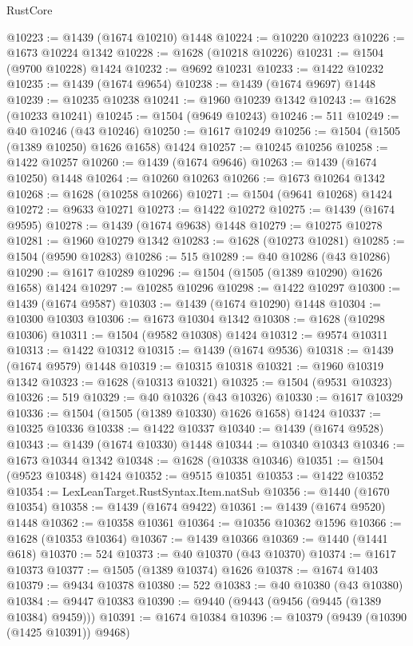 \begin{lexlean}{RustCore}
\begin{coremodule}
@10223 := @1439 (@1674 @10210) @1448
@10224 := @10220 @10223
@10226 := @1673 @10224 @1342
@10228 := @1628 (@10218 @10226)
@10231 := @1504 (@9700 @10228) @1424
@10232 := @9692 @10231
@10233 := @1422 @10232
@10235 := @1439 (@1674 @9654)
@10238 := @1439 (@1674 @9697) @1448
@10239 := @10235 @10238
@10241 := @1960 @10239 @1342
@10243 := @1628 (@10233 @10241)
@10245 := @1504 (@9649 @10243)
@10246 := 511
@10249 := @40 @10246 (@43 @10246)
@10250 := @1617 @10249
@10256 := @1504 (@1505 (@1389 @10250) @1626 @1658) @1424
@10257 := @10245 @10256
@10258 := @1422 @10257
@10260 := @1439 (@1674 @9646)
@10263 := @1439 (@1674 @10250) @1448
@10264 := @10260 @10263
@10266 := @1673 @10264 @1342
@10268 := @1628 (@10258 @10266)
@10271 := @1504 (@9641 @10268) @1424
@10272 := @9633 @10271
@10273 := @1422 @10272
@10275 := @1439 (@1674 @9595)
@10278 := @1439 (@1674 @9638) @1448
@10279 := @10275 @10278
@10281 := @1960 @10279 @1342
@10283 := @1628 (@10273 @10281)
@10285 := @1504 (@9590 @10283)
@10286 := 515
@10289 := @40 @10286 (@43 @10286)
@10290 := @1617 @10289
@10296 := @1504 (@1505 (@1389 @10290) @1626 @1658) @1424
@10297 := @10285 @10296
@10298 := @1422 @10297
@10300 := @1439 (@1674 @9587)
@10303 := @1439 (@1674 @10290) @1448
@10304 := @10300 @10303
@10306 := @1673 @10304 @1342
@10308 := @1628 (@10298 @10306)
@10311 := @1504 (@9582 @10308) @1424
@10312 := @9574 @10311
@10313 := @1422 @10312
@10315 := @1439 (@1674 @9536)
@10318 := @1439 (@1674 @9579) @1448
@10319 := @10315 @10318
@10321 := @1960 @10319 @1342
@10323 := @1628 (@10313 @10321)
@10325 := @1504 (@9531 @10323)
@10326 := 519
@10329 := @40 @10326 (@43 @10326)
@10330 := @1617 @10329
@10336 := @1504 (@1505 (@1389 @10330) @1626 @1658) @1424
@10337 := @10325 @10336
@10338 := @1422 @10337
@10340 := @1439 (@1674 @9528)
@10343 := @1439 (@1674 @10330) @1448
@10344 := @10340 @10343
@10346 := @1673 @10344 @1342
@10348 := @1628 (@10338 @10346)
@10351 := @1504 (@9523 @10348) @1424
@10352 := @9515 @10351
@10353 := @1422 @10352
@10354 := LexLeanTarget.RustSyntax.Item.natSub
@10356 := @1440 (@1670 @10354)
@10358 := @1439 (@1674 @9422)
@10361 := @1439 (@1674 @9520) @1448
@10362 := @10358 @10361
@10364 := @10356 @10362 @1596
@10366 := @1628 (@10353 @10364)
@10367 := @1439 @10366
@10369 := @1440 (@1441 @618)
@10370 := 524
@10373 := @40 @10370 (@43 @10370)
@10374 := @1617 @10373
@10377 := @1505 (@1389 @10374) @1626
@10378 := @1674 @1403
@10379 := @9434 @10378
@10380 := 522
@10383 := @40 @10380 (@43 @10380)
@10384 := @9447 @10383
@10390 := @9440 (@9443 (@9456 (@9445 (@1389 @10384) @9459)))
@10391 := @1674 @10384
@10396 := @10379 (@9439 (@10390 (@1425 @10391)) @9468)

\end{coremodule}
\end{lexlean}
